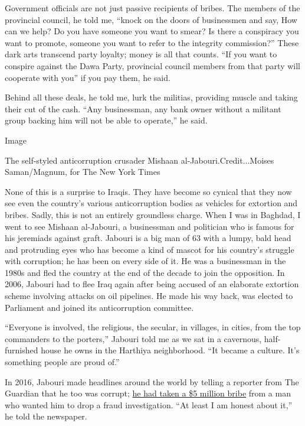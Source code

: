 Government officials are not just passive recipients of bribes. The
members of the provincial council, he told me, ``knock on the doors of
businessmen and say, How can we help? Do you have someone you want to
smear? Is there a conspiracy you want to promote, someone you want to
refer to the integrity commission?'' These dark arts transcend party
loyalty; money is all that counts. ``If you want to conspire against the
Dawa Party, provincial council members from that party will cooperate
with you'' if you pay them, he said.

Behind all these deals, he told me, lurk the militias, providing muscle
and taking their cut of the cash. ``Any businessman, any bank owner
without a militant group backing him will not be able to operate,'' he
said.

Image

The self-styled anticorruption crusader Mishaan
al-Jabouri.Credit...Moises Saman/Magnum, for The New York Times

None of this is a surprise to Iraqis. They have become so cynical that
they now see even the country's various anticorruption bodies as
vehicles for extortion and bribes. Sadly, this is not an entirely
groundless charge. When I was in Baghdad, I went to see Mishaan
al-Jabouri, a businessman and politician who is famous for his jeremiads
against graft. Jabouri is a big man of 63 with a lumpy, bald head and
protruding eyes who has become a kind of mascot for his country's
struggle with corruption; he has been on every side of it. He was a
businessman in the 1980s and fled the country at the end of the decade
to join the opposition. In 2006, Jabouri had to flee Iraq again after
being accused of an elaborate extortion scheme involving attacks on oil
pipelines. He made his way back, was elected to Parliament and joined
its anticorruption committee.

``Everyone is involved, the religious, the secular, in villages, in
cities, from the top commanders to the porters,'' Jabouri told me as we
sat in a cavernous, half-furnished house he owns in the Harthiya
neighborhood. ``It became a culture. It's something people are proud
of.''

In 2016, Jabouri made headlines around the world by telling a reporter
from The Guardian that he too was corrupt;
\href{https://www.theguardian.com/world/2016/feb/19/post-war-iraq-corruption-oil-prices-revenues}{he
had taken a \$5 million bribe} from a man who wanted him to drop a fraud
investigation. ``At least I am honest about it,'' he told the newspaper.

